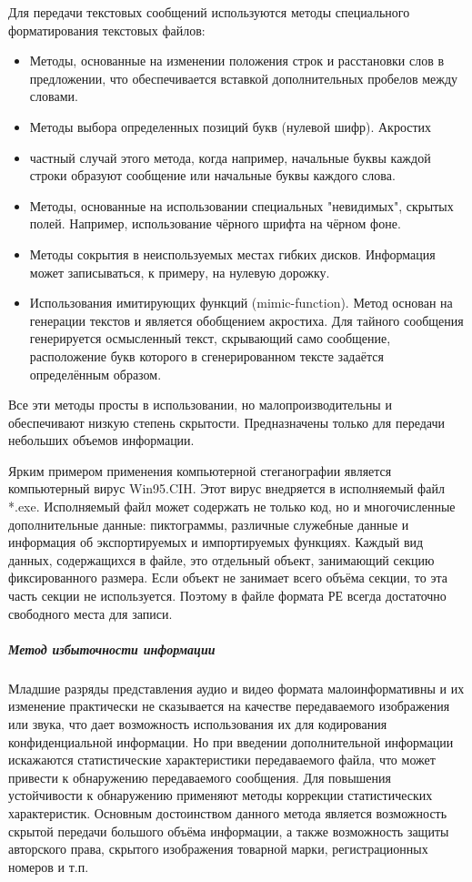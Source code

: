 Для передачи текстовых сообщений используются методы специального
форматирования текстовых файлов:

\begin{itemize}
  \item Методы, основанные на изменении положения строк и расстановки слов
      в предложении, что обеспечивается вставкой дополнительных пробелов
      между словами.
  \item Методы выбора определенных позиций букв (нулевой шифр). Акростих
      \item частный случай этого метода, когда например, начальные буквы
      каждой строки образуют сообщение или начальные буквы каждого слова.
  \item Методы, основанные на использовании специальных "невидимых",
      скрытых полей. Например, использование чёрного шрифта на чёрном фоне.
  \item Методы сокрытия в неиспользуемых местах гибких дисков. Информация
      может записываться, к примеру, на нулевую дорожку.
  \item Использования имитирующих функций (mimic-function). Метод основан
      на генерации текстов и является обобщением акростиха. Для тайного
      сообщения генерируется осмысленный текст, скрывающий само сообщение,
      расположение букв которого в сгенерированном тексте задаётся
      определённым образом.
\end{itemize}

Все эти методы просты в использовании, но малопроизводительны и обеспечивают
низкую степень скрытости. Предназначены только для передачи небольших объемов
информации.

Ярким примером применения компьютерной стеганографии является компьютерный
вирус Win95.CIH. Этот вирус внедряется в исполняемый файл *.exe. Исполняемый
файл может содержать не только код, но и многочисленные дополнительные
данные: пиктограммы, различные служебные данные и информация об
экспортируемых и импортируемых функциях. Каждый вид данных, содержащихся в
файле, это отдельный объект, занимающий секцию фиксированного размера. Если
объект не занимает всего объёма секции, то эта часть секции не используется.
Поэтому в файле формата РЕ всегда достаточно свободного места для записи.

\subparagraph{Метод избыточности информации}
%
Младшие разряды представления аудио и видео формата малоинформативны и их
изменение практически не сказывается на качестве передаваемого изображения
или звука, что дает возможность использования их для кодирования
конфиденциальной информации. Но при введении дополнительной информации
искажаются статистические характеристики передаваемого файла, что может
привести к обнаружению передаваемого сообщения. Для повышения устойчивости к
обнаружению применяют методы коррекции статистических характеристик. Основным
достоинством данного метода является возможность скрытой передачи большого
объёма информации, а также возможность защиты авторского права, скрытого
изображения товарной марки, регистрационных номеров и т.п.

